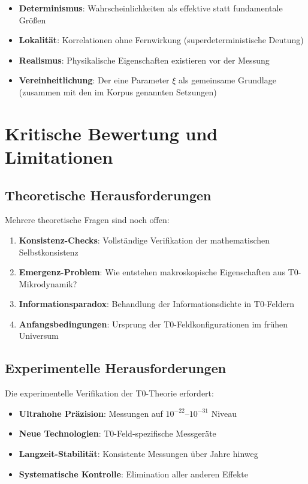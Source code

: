 	\begin{itemize}
		\item \textbf{Determinismus}: Wahrscheinlichkeiten als effektive statt fundamentale Größen
		\item \textbf{Lokalität}: Korrelationen ohne Fernwirkung (superdeterministische Deutung)
		\item \textbf{Realismus}: Physikalische Eigenschaften existieren vor der Messung
		\item \textbf{Vereinheitlichung}: Der eine Parameter $\xi$ als gemeinsame Grundlage (zusammen mit den im Korpus genannten Setzungen)
	\end{itemize}
	
	\section{Kritische Bewertung und Limitationen}
	
	\subsection{Theoretische Herausforderungen}
	
	Mehrere theoretische Fragen sind noch offen:
	
	\begin{enumerate}
		\item \textbf{Konsistenz-Checks}: Vollständige Verifikation der mathematischen Selbstkonsistenz
		\item \textbf{Emergenz-Problem}: Wie entstehen makroskopische Eigenschaften aus T0-Mikrodynamik?
		\item \textbf{Informationsparadox}: Behandlung der Informationsdichte in T0-Feldern
		\item \textbf{Anfangsbedingungen}: Ursprung der T0-Feldkonfigurationen im frühen Universum
	\end{enumerate}
	
	\subsection{Experimentelle Herausforderungen}
	
	Die experimentelle Verifikation der T0-Theorie erfordert:
	
	\begin{itemize}
		\item \textbf{Ultrahohe Präzision}: Messungen auf $10^{-22}$--$10^{-31}$ Niveau
		\item \textbf{Neue Technologien}: T0-Feld-spezifische Messgeräte
		\item \textbf{Langzeit-Stabilität}: Konsistente Messungen über Jahre hinweg
		\item \textbf{Systematische Kontrolle}: Elimination aller anderen Effekte
	\end{itemize}
	
